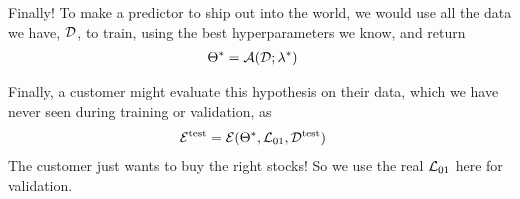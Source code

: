Finally!  To make a predictor to ship out into the world, we would use
all the data we have, ${\cal D}$, to train, using the best
hyperparameters we know, and return
\begin{align*}
  \Theta^* & = \mathcal{A}({\cal D}; \lambda^*)
\end{align*}

Finally, a customer might evaluate this hypothesis on their data,
which we have never seen during training or validation, as
\begin{align*}
  \mathcal{E}^\text{test} & = \mathcal{E}(\Theta^*, \mathcal{L}_{01},
  {\cal D}^\text{test})
\end{align*}
The customer just wants to buy the right stocks!  So we use the real
$\mathcal{L}_{01}$ here for validation.


